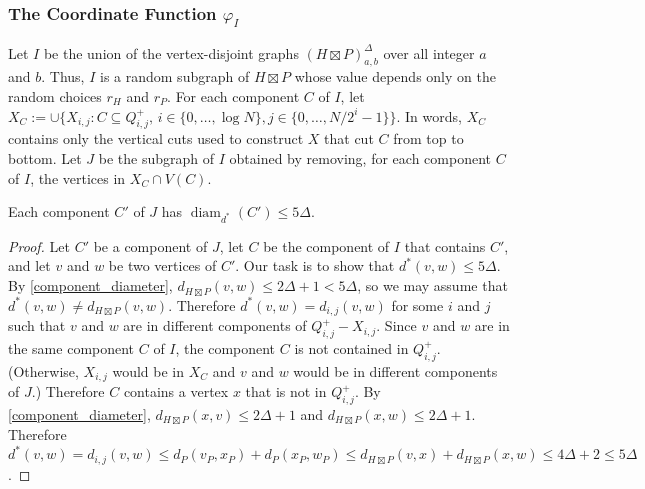 \documentclass{patmorin}
\renewcommand{\le}{\leqslant}
\DeclareMathOperator{\diam}{diam}
\begin{document}
%
%

\subsubsection{\boldmath The Coordinate Function $\varphi_I$}

Let $I$ be the union of the vertex-disjoint graphs $(H\boxtimes P)^\Delta_{a,b}$ over all integer $a$ and $b$.
Thus, $I$ is a random subgraph of $H\boxtimes P$ whose value depends only on the random choices $r_H$ and $r_P$.  For each component $C$ of $I$, let $X_C:=\cup\{X_{i,j}:C\subseteq Q^+_{i,j},\, i\in\{0,\ldots,\log N\}, j\in\{0,\ldots,N/2^i-1\}\}$.  In words, $X_C$ contains only the vertical cuts used to construct $X$ that cut $C$ from top to bottom. Let $J$ be the subgraph of $I$ obtained by removing, for each component $C$ of $I$, the vertices in $X_C\cap V(C)$.

\begin{clm}\label{dstar_component_diameter}
  Each component $C'$ of $J$ has $\diam_{d^*}(C')\le 5\Delta$.
\end{clm}

\begin{proof}
  Let $C'$ be a component of $J$, let $C$ be the component of $I$ that contains $C'$, and let $v$ and $w$ be two vertices of $C'$. Our task is to show that $d^*(v,w)\le 5\Delta$.  By \cref{component_diameter}, $d_{H\boxtimes P}(v,w)\le 2\Delta+1< 5\Delta$, so we may assume that $d^*(v,w)\neq d_{H\boxtimes P}(v,w)$.  Therefore $d^*(v,w)=d_{i,j}(v,w)$ for some $i$ and $j$ such that $v$ and $w$ are in different components of $Q^+_{i,j}-X_{i,j}$.  Since $v$ and $w$ are in the same component $C$ of $I$, the component $C$ is not contained in $Q^+_{i,j}$. (Otherwise, $X_{i,j}$ would be in $X_C$ and $v$ and $w$ would be in different components of $J$.) Therefore $C$ contains a vertex $x$ that is not in $Q^+_{i,j}$.  By \cref{component_diameter}, $d_{H\boxtimes P}(x,v)\le 2\Delta+1$ and $d_{H\boxtimes P}(x,w)\le 2\Delta+1$.  Therefore $d^*(v,w)=d_{i,j}(v,w)\le d_P(v_P,x_P)+d_P(x_P,w_P)\le d_{H\boxtimes P}(v,x)+d_{H\boxtimes P}(x,w)\le 4\Delta+2\le 5\Delta$.
\end{proof}
\end{document}
